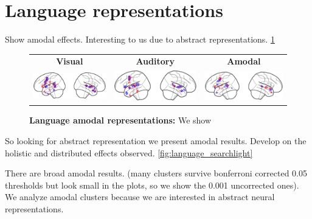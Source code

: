 \section{Language representations}

Show amodal effects. Interesting to us due to abstract representations.
\ref{fig:language_amodal}

\begin{figure}[ht]
\scriptsize
\vspace{5ex}
\hspace{-4ex}
\begin{tabular}{ccc}
\textbf{\Large Visual} & \textbf{\Large Auditory} & \textbf{\Large Amodal}\\
{\includegraphics[width=.3\linewidth]{figures/part_II/searchlight/amodal/language_Vis-Vis_segmentation.pdf}}
\hspace{1ex}
&{\includegraphics[width=.3\linewidth]{figures/part_II/searchlight/amodal/language_Aud-Aud_segmentation.pdf}}
\hspace{1ex}
&{\includegraphics[width=.3\linewidth]{figures/part_II/searchlight/amodal/language_amodal_segmentation.pdf}}
\hspace{1ex}\\
\end{tabular}
\vspace{3ex}
\caption{\textbf{Language amodal representations:} We show}
\label{fig:language_amodal}
\end{figure}


So looking for abstract representation we present amodal results. Develop on the holistic and distributed effects observed.
\ref{fig:language_searchlight}

There are broad amodal results. (many clusters survive bonferroni corrected 0.05 thresholds but look small in the plots, so we show the 0.001 uncorrected ones). We analyze amodal clusters because we are interested in abstract neural representations.

